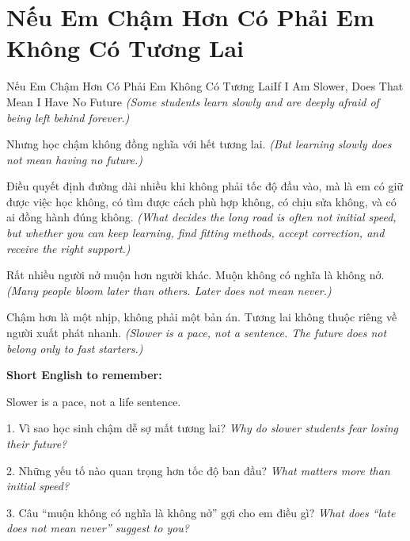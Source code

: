\section{Nếu Em Chậm Hơn Có Phải Em Không Có Tương Lai}
\begin{truyen}{Nếu Em Chậm Hơn Có Phải Em Không Có Tương Lai}{If I Am Slower, Does That Mean I Have No Future}
\textit{(Some students learn slowly and are deeply afraid of being left behind forever.)}

Nhưng học chậm không đồng nghĩa với hết tương lai.
\textit{(But learning slowly does not mean having no future.)}

Điều quyết định đường dài nhiều khi không phải tốc độ đầu vào, mà là em có giữ được việc học không, có tìm được cách phù hợp không, có chịu sửa không, và có ai đồng hành đúng không.
\textit{(What decides the long road is often not initial speed, but whether you can keep learning, find fitting methods, accept correction, and receive the right support.)}

Rất nhiều người nở muộn hơn người khác. Muộn không có nghĩa là không nở.
\textit{(Many people bloom later than others. Later does not mean never.)}
\end{truyen}

\begin{baihoc}
Chậm hơn là một nhịp, không phải một bản án. Tương lai không thuộc riêng về người xuất phát nhanh.
\textit{(Slower is a pace, not a sentence. The future does not belong only to fast starters.)}
\end{baihoc}

\begin{ghinhoanh}
\textbf{Short English to remember:}

Slower is a pace, not a life sentence.

\end{ghinhoanh}

\begin{tuhocnhanh}
1. Vì sao học sinh chậm dễ sợ mất tương lai? \textit{Why do slower students fear losing their future?}

2. Những yếu tố nào quan trọng hơn tốc độ ban đầu? \textit{What matters more than initial speed?}

3. Câu “muộn không có nghĩa là không nở” gợi cho em điều gì? \textit{What does “late does not mean never” suggest to you?}
\end{tuhocnhanh}
\ngancach

